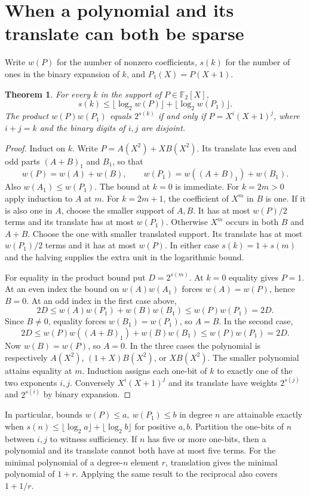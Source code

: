 \documentclass[11pt]{article}
\newtheorem{theorem}{Theorem}
\newcommand{\F}{\mathbb F_2}
\begin{document}
\section{When a polynomial and its translate can both be sparse}
\label{sec:shift-weight}
Write \(w(P)\) for the number of nonzero coefficients, \(s(k)\) for the
number of ones in the binary expansion of \(k\), and \(P_1(X)=P(X+1)\).
\begin{theorem}
For every \(k\) in the support of \(P\in\F[X]\),
\[
        s(k)\le \lfloor\log_2 w(P)\rfloor+\lfloor\log_2 w(P_1)\rfloor .
\]
The product \(w(P)w(P_1)\) equals \(2^{s(k)}\) if and only if
\(P=X^i(X+1)^j\), where \(i+j=k\) and the binary digits of \(i,j\)
are disjoint.
\end{theorem}
\begin{proof}
Induct on \(k\). Write \(P=A(X^2)+XB(X^2)\). Its translate has
even and odd parts \((A+B)_1\) and \(B_1\), so that
\[
 w(P)=w(A)+w(B),\qquad w(P_1)=w((A+B)_1)+w(B_1).
\]
Also \(w(A_1)\le w(P_1)\). The bound at \(k=0\) is immediate.
For \(k=2m>0\) apply induction to \(A\) at \(m\).
For \(k=2m+1\), the coefficient of \(X^m\) in \(B\) is one.
If it is also one in \(A\), choose the smaller support of \(A,B\).
It has at most \(w(P)/2\) terms and its translate has at most \(w(P_1)\).
Otherwise \(X^m\) occurs in both \(B\) and \(A+B\). Choose the one
with smaller translated support. Its translate has at most \(w(P_1)/2\)
terms and it has at most \(w(P)\). In either case \(s(k)=1+s(m)\)
and the halving supplies the extra unit in the logarithmic bound.

For equality in the product bound put \(D=2^{s(m)}\).
At \(k=0\) equality gives \(P=1\). At an even index the bound on
\(w(A)w(A_1)\) forces \(w(A)=w(P)\), hence \(B=0\).
At an odd index in the first case above,
\[
 2D\le w(A)w(P_1)+w(B)w(B_1)\le w(P)w(P_1)=2D .
\]
Since \(B\ne0\), equality forces \(w(B_1)=w(P_1)\), so \(A=B\).
In the second case,
\[
 2D\le w(P)w((A+B)_1)+w(B)w(B_1)\le w(P)w(P_1)=2D .
\]
Now \(w(B)=w(P)\), so \(A=0\). In the three cases the polynomial
is respectively \(A(X^2)\), \((1+X)B(X^2)\), or \(XB(X^2)\).
The smaller polynomial attains equality at \(m\). Induction assigns
each one-bit of \(k\) to exactly one of the two exponents \(i,j\).
Conversely \(X^i(X+1)^j\) and its translate have weights
\(2^{s(j)}\) and \(2^{s(i)}\) by binary expansion.
\end{proof}

In particular, bounds \(w(P)\le a,\ w(P_1)\le b\) in degree \(n\)
are attainable exactly when
\(s(n)\le\lfloor\log_2 a\rfloor+\lfloor\log_2 b\rfloor\)
for positive \(a,b\). Partition the one-bits of \(n\) between \(i,j\)
to witness sufficiency. If \(n\) has five or more one-bits, then
a polynomial and its translate cannot both have at most five terms.
For the minimal polynomial of a degree-\(n\) element \(r\), translation
gives the minimal polynomial of \(1+r\). Applying the same result to
the reciprocal also covers \(1+1/r\).
\end{document}
